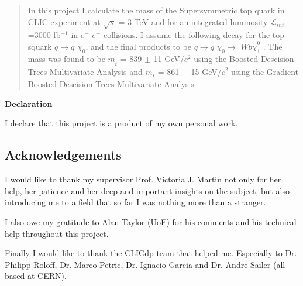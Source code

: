 \documentclass[12pt,a4paper]{report}
\begin{document}
\newpage



\begin{abstract}
In this project I calculate the mass of the Supersymmetric top quark in CLIC experiment at $\sqrt{s}$ = 3 TeV
and for an integrated luminosity $\mathcal{L}_{int}$=3000 fb$^{-1}$
in $e^{-}$ $e^{+}$ collisions. I assume the following decay for the top squark $\tilde{q} \rightarrow q$ 
$\chi_{0}$, 
and the final products to be
$\tilde{q} \rightarrow q$ $\chi_{0} \rightarrow$ $W b \tilde{\chi}_{1}^{0}$ .
The mass was found  to be  $m_{\tilde{t}}$ = 839 $\pm$ 11 GeV/$c^{2}$ using the Boosted Descision 
Trees Multivariate Analysis and $m_{\tilde{t}}$ = 861 $\pm$ 15 GeV/$c^{2}$ using the Gradient Boosted Descision  Trees Multivariate Analysis. 
\end{abstract}



\textbf{Declaration}

I declare that this project is a product of my own personal work.


\newpage

\tableofcontents
\listoftables
\listoffigures

\begin{titlepage}
\vspace*{2in}
\section*{Acknowledgements}

I would like to thank my supervisor Prof. Victoria J. Martin not only for her help, her patience and
her deep and important insights on the subject, but also introducing me to a field that so far I was nothing 
more than a stranger.

I also owe my gratitude to Alan Taylor (UoE) for his comments and his technical help throughout this 
project.

Finally I would like to thank the CLICdp team that helped me. Especially
to Dr. Philipp Roloff, Dr. Marco Petric, Dr. Ignacio Garcia and Dr. Andre Sailer (all based at CERN).


\end{titlepage}

\end{document}
